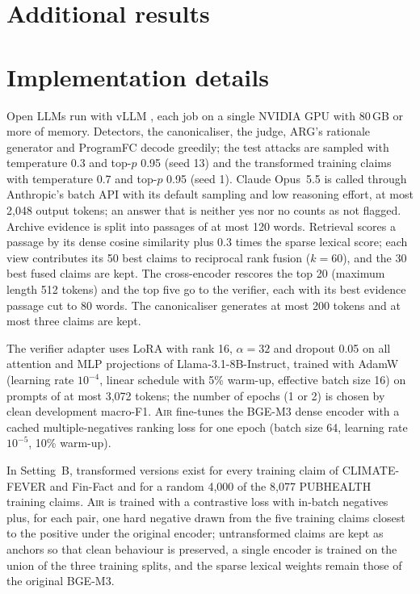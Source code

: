 \documentclass[11pt]{article}
\newcommand{\air}{\textsc{Air}}
\begin{document}
\section{Additional results}
\label{sec:appendix_results}










\section{Implementation details}
\label{sec:appendix_impl}

Open LLMs run with vLLM \citep{kwon2023vllm}, each job on a single NVIDIA GPU with 80\,GB or more of memory. Detectors, the canonicaliser, the judge, ARG's rationale generator and ProgramFC decode greedily; the test attacks are sampled with temperature 0.3 and top-$p$ 0.95 (seed 13) and the transformed training claims with temperature 0.7 and top-$p$ 0.95 (seed 1). Claude Opus~5.5 is called through Anthropic's batch API with its default sampling and low reasoning effort, at most 2,048 output tokens; an answer that is neither yes nor no counts as not flagged. Archive evidence is split into passages of at most 120 words. Retrieval scores a passage by its dense cosine similarity plus 0.3 times the sparse lexical score; each view contributes its 50 best claims to reciprocal rank fusion ($k=60$), and the 30 best fused claims are kept. The cross-encoder rescores the top 20 (maximum length 512 tokens) and the top five go to the verifier, each with its best evidence passage cut to 80 words. The canonicaliser generates at most 200 tokens and at most three claims are kept.

The verifier adapter uses LoRA with rank 16, $\alpha=32$ and dropout 0.05 on all attention and MLP projections of Llama-3.1-8B-Instruct, trained with AdamW \citep{loshchilov2019adamw} (learning rate $10^{-4}$, linear schedule with 5\% warm-up, effective batch size 16) on prompts of at most 3,072 tokens; the number of epochs (1 or 2) is chosen by clean development macro-F1. \air{} fine-tunes the BGE-M3 dense encoder with a cached multiple-negatives ranking loss \citep{henderson2017efficient,gao2021gradcache} for one epoch (batch size 64, learning rate $10^{-5}$, 10\% warm-up).

In Setting~B, transformed versions exist for every training claim of CLIMATE-FEVER and Fin-Fact and for a random 4,000 of the 8,077 PUBHEALTH training claims. \air{} is trained with a contrastive loss with in-batch negatives plus, for each pair, one hard negative drawn from the five training claims closest to the positive under the original encoder; untransformed claims are kept as anchors so that clean behaviour is preserved, a single encoder is trained on the union of the three training splits, and the sparse lexical weights remain those of the original BGE-M3.
\end{document}
